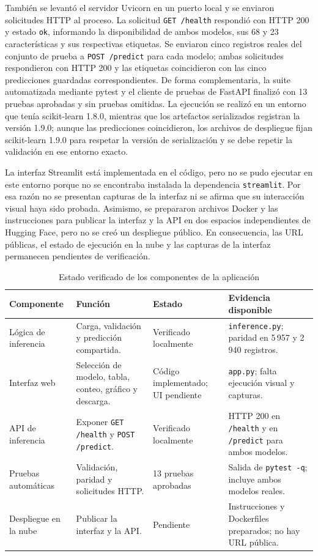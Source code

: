 \documentclass[conference]{IEEEtran}
\begin{document}
También se levantó el servidor Uvicorn en un puerto local y se enviaron solicitudes HTTP al proceso. La solicitud \texttt{GET /health} respondió con HTTP 200 y estado \texttt{ok}, informando la disponibilidad de ambos modelos, sus 68 y 23 características y sus respectivas etiquetas. Se enviaron cinco registros reales del conjunto de prueba a \texttt{POST /predict} para cada modelo; ambas solicitudes respondieron con HTTP 200 y las etiquetas coincidieron con las cinco predicciones guardadas correspondientes. De forma complementaria, la suite automatizada mediante pytest y el cliente de pruebas de FastAPI finalizó con 13 pruebas aprobadas y sin pruebas omitidas. La ejecución se realizó en un entorno que tenía scikit-learn 1.8.0, mientras que los artefactos serializados registran la versión 1.9.0; aunque las predicciones coincidieron, los archivos de despliegue fijan scikit-learn 1.9.0 para respetar la versión de serialización y se debe repetir la validación en ese entorno exacto.

La interfaz Streamlit está implementada en el código, pero no se pudo ejecutar en este entorno porque no se encontraba instalada la dependencia \texttt{streamlit}. Por esa razón no se presentan capturas de la interfaz ni se afirma que su interacción visual haya sido probada. Asimismo, se prepararon archivos Docker y las instrucciones para publicar la interfaz y la API en dos espacios independientes de Hugging Face, pero no se creó un despliegue público. En consecuencia, las URL públicas, el estado de ejecución en la nube y las capturas de la interfaz permanecen pendientes de verificación.

\begin{table}[!t]
\centering
\caption{Estado verificado de los componentes de la aplicación}
\label{tab:componentes}
\small
\begin{tabular}{p{2.6cm}p{4.6cm}p{2.4cm}p{5.8cm}}
\toprule
\textbf{Componente} & \textbf{Función} & \textbf{Estado} & \textbf{Evidencia disponible} \\
\midrule
Lógica de inferencia & Carga, validación y predicción compartida. & Verificado localmente & \texttt{inference.py}; paridad en 5\,957 y 2\,940 registros. \\
Interfaz web & Selección de modelo, tabla, conteo, gráfico y descarga. & Código implementado; UI pendiente & \texttt{app.py}; falta ejecución visual y capturas. \\
API de inferencia & Exponer \texttt{GET /health} y \texttt{POST /predict}. & Verificado localmente & HTTP 200 en \texttt{/health} y en \texttt{/predict} para ambos modelos. \\
Pruebas automáticas & Validación, paridad y solicitudes HTTP. & 13 pruebas aprobadas & Salida de \texttt{pytest -q}; incluye ambos modelos reales. \\
Despliegue en la nube & Publicar la interfaz y la API. & Pendiente & Instrucciones y Dockerfiles preparados; no hay URL pública. \\
\bottomrule
\end{tabular}
\end{table}
\end{document}
